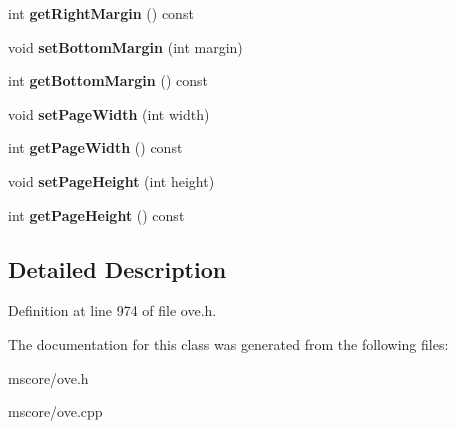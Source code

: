 \begin{DoxyCompactItemize}
int {\bfseries get\+Right\+Margin} () const
\item 
\mbox{\label{class_o_v_e_1_1_page_a544ae2b2f7c75e63138f7a2079dd5c87}} 
void {\bfseries set\+Bottom\+Margin} (int margin)
\item 
\mbox{\label{class_o_v_e_1_1_page_abdf850d57be96bed78dc035b8e15f045}} 
int {\bfseries get\+Bottom\+Margin} () const
\item 
\mbox{\label{class_o_v_e_1_1_page_a747b2752eecee4008d04e7a83ff895af}} 
void {\bfseries set\+Page\+Width} (int width)
\item 
\mbox{\label{class_o_v_e_1_1_page_a9db3e21bac0241a2531c58b0e59b610b}} 
int {\bfseries get\+Page\+Width} () const
\item 
\mbox{\label{class_o_v_e_1_1_page_aef23623e7b0c3383926655900766be68}} 
void {\bfseries set\+Page\+Height} (int height)
\item 
\mbox{\label{class_o_v_e_1_1_page_a00dd31c1e22501dd9ecb691e4fda70f6}} 
int {\bfseries get\+Page\+Height} () const
\end{DoxyCompactItemize}


\subsection{Detailed Description}


Definition at line 974 of file ove.\+h.



The documentation for this class was generated from the following files\+:\begin{DoxyCompactItemize}
\item 
mscore/ove.\+h\item 
mscore/ove.\+cpp\end{DoxyCompactItemize}
